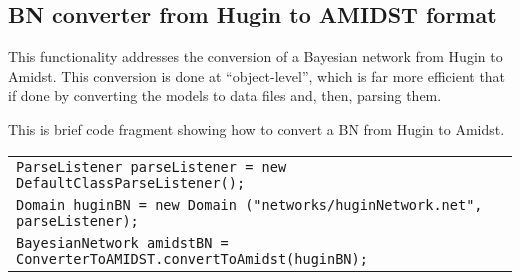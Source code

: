 \subsection{BN converter from Hugin to AMIDST format} \label{ConverterFromHuginToAmidst}

This functionality addresses the conversion of a Bayesian network from Hugin to Amidst. This conversion is done at ``object-level'', which is far more efficient that if done by converting the models to data files and, then, parsing them. 

This is brief code fragment showing how to convert a BN from Hugin to Amidst. 

\begin{table}[H]
\begin{tabular}{l} \hline

\texttt{ParseListener parseListener = new DefaultClassParseListener();}\\    
\texttt{Domain huginBN = new Domain ("networks/huginNetwork.net", parseListener);}\\
\texttt{BayesianNetwork amidstBN = ConverterToAMIDST.convertToAmidst(huginBN);}\\  \hline 

\end{tabular}
\end{table} 
